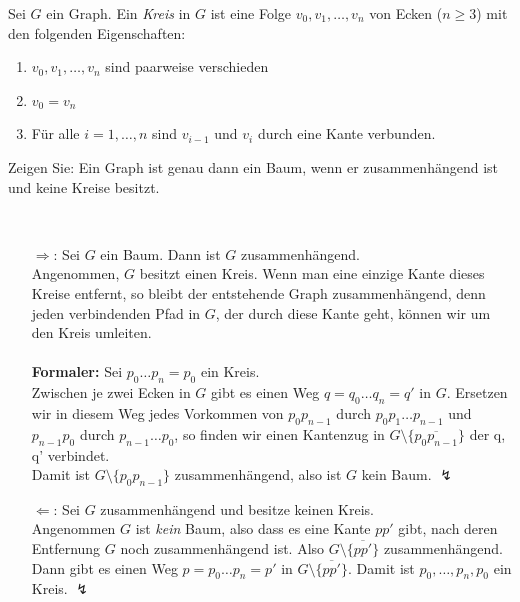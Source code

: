 \begin{assignment}
  Sei \( G \) ein Graph. Ein \emph{Kreis} in \( G \) ist eine Folge \( v_0, v_1, \dots, v_n \) von Ecken (\( n \geq 3 \)) mit den folgenden Eigenschaften:
  \begin{enumerate}
    \item \( v_0, v_1, \dots, v_n \) sind paarweise verschieden
    \item \( v_0 = v_n \) 
    \item Für alle \( i = 1, \dots, n \) sind \( v_{ i-1 } \) und \( v_i \) durch eine Kante verbunden.
  \end{enumerate} 
  Zeigen Sie: Ein Graph ist genau dann ein Baum, wenn er zusammenhängend ist und keine Kreise besitzt.
\end{assignment}
\begin{solution}
  \
  \begin{itemize}
    \item [\( \Rightarrow \):] Sei \( G \) ein Baum. Dann ist \( G \) zusammenhängend. \\
    Angenommen, \( G \) besitzt einen Kreis. Wenn man eine einzige Kante dieses Kreise entfernt, so bleibt der entstehende Graph zusammenhängend, denn jeden verbindenden Pfad in \( G \), der durch diese Kante geht, können wir um den Kreis umleiten. \\ 
    \\
    \textbf{Formaler:} Sei \( p_0 \dots p_n = p_0 \) ein Kreis. \\
    Zwischen je zwei Ecken in \( G \) gibt es einen Weg \( q = q_0 \dots q_n = q' \) in \( G \). Ersetzen wir in diesem Weg jedes Vorkommen von \( p_0p_{n-1} \) durch \( p_0p_1 \dots p_{n-1} \) und \( p_{n-1}p_0 \) durch \( p_{n-1} \dots p_0 \), so finden wir einen Kantenzug in \( G \setminus \{ \overline{p_0p_{n-1}} \} \) der q, q' verbindet. \\
    Damit ist \( G \setminus \{ p_0p_{n-1} \} \) zusammenhängend, also ist \( G \) kein Baum. \quad \( \lightning \) 
    
    \item [\( \Leftarrow \):] Sei \( G \) zusammenhängend und besitze keinen Kreis. \\
    Angenommen \( G \) ist \emph{kein} Baum, also dass es eine Kante \( pp' \) gibt, nach deren Entfernung \( G \) noch zusammenhängend ist. Also \( G \setminus \{ \overline{pp'} \} \) zusammenhängend. \\
    Dann gibt es einen Weg \( p = p_0 \dots p_n = p' \) in \( G \setminus \{ \overline{pp'} \} \). Damit ist \( p_0, \dots, p_n, p_0 \) ein Kreis. \quad \( \lightning \) 
  \end{itemize} 
\end{solution}


